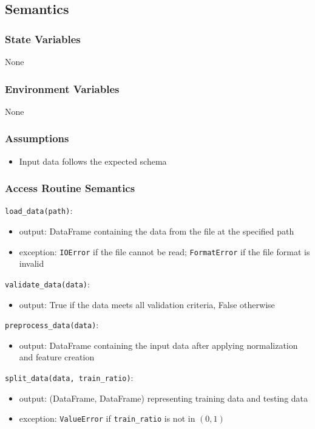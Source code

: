 \documentclass[12pt, titlepage]{article}
\begin{document}
\subsection{Semantics}

\subsubsection{State Variables}
None

\subsubsection{Environment Variables}

None

\subsubsection{Assumptions}

\begin{itemize}
  \item Input data follows the expected schema
\end{itemize}
\subsubsection{Access Routine Semantics}

\noindent \texttt{load\_data(path)}:
\begin{itemize}
\item output: DataFrame containing the data from the file at the specified path
\item exception: \texttt{IOError} if the file cannot be read; \texttt{FormatError} if the file format is invalid
\end{itemize}

\noindent \texttt{validate\_data(data)}:
\begin{itemize}
\item output: True if the data meets all validation criteria, False otherwise
\end{itemize}

\noindent \texttt{preprocess\_data(data)}:
\begin{itemize}
\item output: DataFrame containing the input data after applying normalization and feature creation
\end{itemize}

\noindent \texttt{split\_data(data, train\_ratio)}:
\begin{itemize}
\item output: (DataFrame, DataFrame) representing training data and testing data
\item exception: \texttt{ValueError} if \texttt{train\_ratio} is not in $(0,1)$
\end{itemize}
\end{document}
